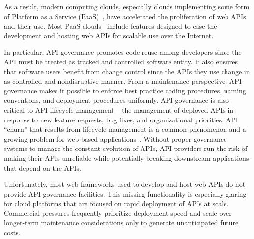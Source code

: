 As a result, modern computing clouds, especially clouds implementing some form
of Platform as a Service (PaaS)~\cite{4548165}, have accelerated the
proliferation of
web APIs and their use.  Most PaaS
clouds~\cite{appscale13,cloudfoundry,openshift} include
features designed to
ease the development and hosting web APIs for scalable use over the Internet. 

In particular, API governance promotes code reuse among developers
since the API must be treated as tracked and controlled software entity.
It also ensures that software users benefit from change control since the APIs
they use
change in as controlled and nondisruptive manner.  From a maintenance
perspective, API governance 
makes it possible to enforce best practice coding procedures, 
naming conventions, and deployment procedures uniformly.
API governance is also critical to API lifecycle
management --  the management of deployed APIs in response to new feature
requests, bug fixes, and organizational priorities. 
API ``churn'' that results from lifecycle management
is a common phenomenon and a growing
problem for web-based applications~\cite{portingeffort}.
Without proper governance systems to manage the constant evolution of APIs,
API providers run the risk of making their APIs unreliable while potentially
breaking downstream applications that depend on the APIs.


Unfortunately, most web frameworks used to develop and host web APIs do not 
provide API governance facilities. This missing functionality is
especially glaring
for cloud platforms that are focused on rapid
deployment of APIs at scale.   Commercial pressures frequently prioritize
deployment speed and scale over longer-term maintenance considerations only to
generate unanticipated future costs.

